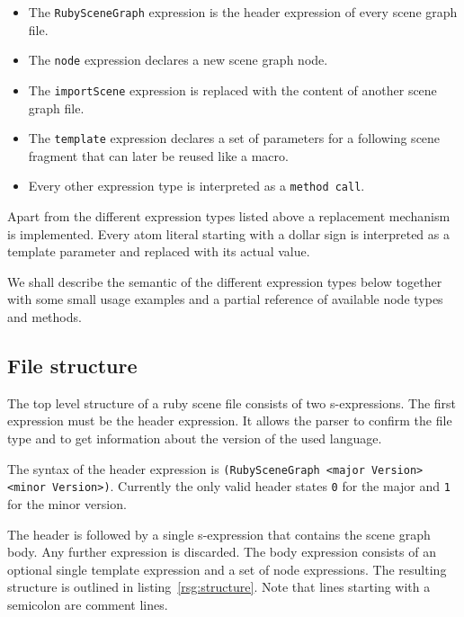 \begin{itemize}
  
\item The \texttt{RubySceneGraph} expression is the header expression
  of every scene graph file.
\item The \texttt{node} expression declares a new scene graph node.  

\item The \texttt{importScene} expression is replaced with the content
  of another scene graph file.
  
\item The \texttt{template} expression declares a set of parameters
  for a following scene fragment that can later be reused like a
  macro.
 
\item Every other expression type is interpreted as a \texttt{method
    call}.

\end{itemize}

Apart from the different expression types listed above a replacement
mechanism is implemented. Every atom literal starting with a dollar
sign is interpreted as a template parameter and replaced with its
actual value.

We shall describe the semantic of the different expression types below
together with some small usage examples and a partial reference of
available node types and methods.

\subsection{File structure}

The top level structure of a ruby scene file consists of two
s-expressions. The first expression must be the header expression. It
allows the parser to confirm the file type and to get information
about the version of the used language.

The syntax of the header expression is \texttt{(RubySceneGraph <major
  Version> <minor Version>)}. Currently the only valid header states
\texttt{0} for the major and \texttt{1} for the minor version.

The header is followed by a single s-expression that contains the
scene graph body. Any further expression is discarded. The body
expression consists of an optional single template expression and a
set of node expressions. The resulting structure is outlined in
listing~\ref{rsg:structure}. Note that lines starting with a semicolon
are comment lines.

